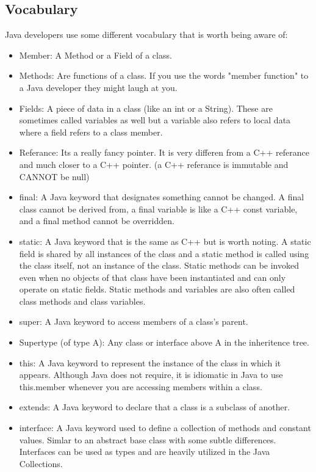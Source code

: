 \documentclass[../../main.tex]{subfiles}
\begin{document}
\subsection{Vocabulary}
Java developers use some different vocabulary that is worth being
aware of:
   \begin{itemize}
      \item Member: A Method or a Field of a class.
      \item Methods: Are functions of a class. If you use the words
         "member function" to a Java developer they might laugh at you.
      \item Fields: A piece of data in a class (like an int or a
         String). These are sometimes called variables as well but a
         variable also refers to local data where a field refers to a
         class member.
      \item Referance: Its a really fancy pointer. It is very differen
         from a C++ referance and much closer to a C++ pointer.
         (a C++ referance is immutable and CANNOT be null)
      \item final: A Java keyword that designates something cannot be
         changed. A final class cannot be derived from, a final
         variable is like a C++ const variable, and a final method
         cannot be overridden.
      \item static: A Java keyword that is the same as C++ but is worth
         noting. A static field is shared by all instances of the class
         and a static method is called using the class itself, not an
         instance of the class. Static methods can be invoked even when
         no objects of that class have been instantiated and can only
         operate on static fields. Static methods and variables are
         also often called class methods and class variables.
      \item super: A Java keyword to access members of a class's
         parent.
      \item Supertype (of type A): Any class or interface above A in
         the inheritence tree.
      \item this: A Java keyword to represent the instance of the class
         in which it appears. Although Java does not require, it is
         idiomatic in Java to use this.member whenever you are
         accessing members within a class.
      \item extends: A Java keyword to declare that a class is a
         subclass of another.
      \item interface: A Java keyword used to define a collection of
         methods and constant values. Simlar to an abstract base class
         with some subtle differences. Interfaces can be used as types
         and are heavily utilized in the Java Collections.
   \end{itemize}
\end{document}

